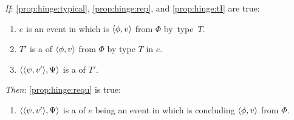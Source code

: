 \begin{note}
  \begin{proposition}
    \label{prop:hinge}


    \begin{itenum}
    \item[\emph{If}:]
      \ref{prop:hinge:typical}, \ref{prop:hinge:rep}, and \ref{prop:hinge:tI} are true:

      \begin{enumerate}[label=\alph*., ref=(\alph*), series=propHingeSer]
      \item
        \label{prop:hinge:typical}
        \(e\) is an event in which \vAgent{} is  \(\langle \phi, v \rangle\) from \(\Phi\) by~type~\(T\).
      \item
        \label{prop:hinge:rep}
        \(T'\) is a \tRep{} of \vAgent{} \tCV{} \(\langle \phi, v \rangle\) from \(\Phi\) by type \(T\) in \(e\).
      \item
        \label{prop:hinge:tI}
        \(\langle \langle \psi, v' \rangle, \Psi \rangle\) is a \tI{} of \(T'\).
      \end{enumerate}

    \item[\emph{Then}:]
      \ref{prop:hinge:requ} is true:
      \begin{enumerate}[label=\alph*., ref=(\alph*), resume*=propHingeSer]
      \item
        \label{prop:hinge:requ}
        \(\langle \langle \psi, v' \rangle, \Psi \rangle\) is a \requ{} of \(e\) being an event in which \vAgent{} is concluding \(\langle \phi, v \rangle\) from \(\Phi\).
      \end{enumerate}
    \end{itenum}
    \vspace{-\baselineskip}
  \end{proposition}


\end{note}
